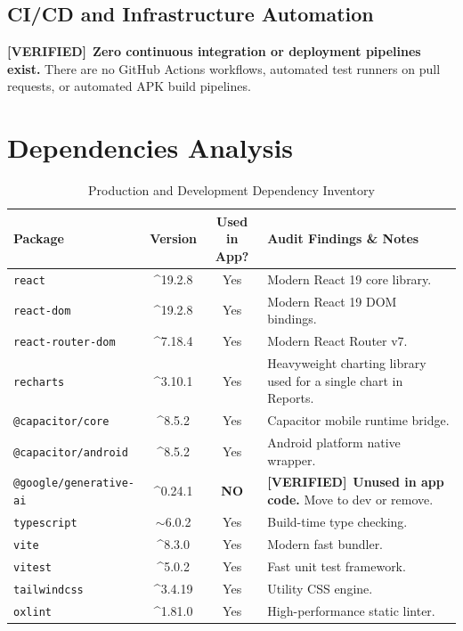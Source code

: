 \documentclass[10pt,a4paper]{report}
\newcommand{\verified}{\colorbox{green!15}{\textcolor{passGreen}{\bfseries\scriptsize [VERIFIED]}}}
\begin{document}
\section{CI/CD and Infrastructure Automation}
\verified\ \textbf{Zero continuous integration or deployment pipelines exist.} There are no GitHub Actions workflows, automated test runners on pull requests, or automated APK build pipelines.

\chapter{Dependencies Analysis}

\begin{table}[htbp]
\centering
\scriptsize
\caption{Production and Development Dependency Inventory}
\begin{tabularx}{\textwidth}{l c c X}
\toprule
\textbf{Package} & \textbf{Version} & \textbf{Used in App?} & \textbf{Audit Findings \& Notes} \\
\midrule
\texttt{react} & \textasciicircum 19.2.8 & Yes & Modern React 19 core library. \\
\texttt{react-dom} & \textasciicircum 19.2.8 & Yes & Modern React 19 DOM bindings. \\
\texttt{react-router-dom} & \textasciicircum 7.18.4 & Yes & Modern React Router v7. \\
\texttt{recharts} & \textasciicircum 3.10.1 & Yes & Heavyweight charting library used for a single chart in Reports. \\
\texttt{@capacitor/core} & \textasciicircum 8.5.2 & Yes & Capacitor mobile runtime bridge. \\
\texttt{@capacitor/android} & \textasciicircum 8.5.2 & Yes & Android platform native wrapper. \\
\texttt{@google/generative-ai} & \textasciicircum 0.24.1 & \textbf{NO} & \verified\ \textbf{Unused in app code.} Move to dev or remove. \\
\texttt{typescript} & $\sim$6.0.2 & Yes & Build-time type checking. \\
\texttt{vite} & \textasciicircum 8.3.0 & Yes & Modern fast bundler. \\
\texttt{vitest} & \textasciicircum 5.0.2 & Yes & Fast unit test framework. \\
\texttt{tailwindcss} & \textasciicircum 3.4.19 & Yes & Utility CSS engine. \\
\texttt{oxlint} & \textasciicircum 1.81.0 & Yes & High-performance static linter. \\
\bottomrule
\end{tabularx}
\end{table}
\end{document}
